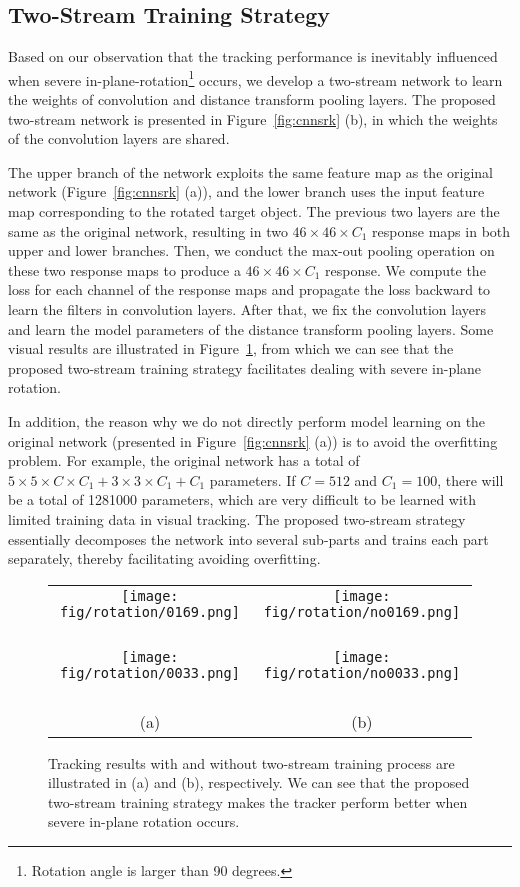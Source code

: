 \documentclass[10pt,twocolumn,letterpaper]{article}
\begin{document}
\subsection{Two-Stream Training Strategy}
Based on our observation that the tracking performance is inevitably influenced
when severe in-plane-rotation\footnote{Rotation angle is larger than 90 degrees.}
occurs, we develop a two-stream network to learn the weights of convolution and
distance transform pooling layers. The proposed two-stream network is presented
in Figure~\ref{fig:cnnsrk} (b), in which the weights of the convolution layers are shared.

The upper branch of the network exploits the same feature map as the original
network (Figure~\ref{fig:cnnsrk} (a)), and the lower branch uses the input
feature map corresponding to the rotated target object.
The previous two layers are the same as the original network, resulting in two
$46\times46\times C_1$ response maps in both upper and lower branches.
Then, we conduct the max-out pooling operation on these two response maps to
produce a $46\times46\times C_1$ response.
We compute the loss for each channel of the response maps and propagate the
loss backward to learn the filters in convolution layers.
After that, we fix the convolution layers and learn the model parameters of
the distance transform pooling layers.
Some visual results are illustrated in Figure~\ref{fig:rotation_result},
from which we can see that the proposed two-stream training strategy
facilitates dealing with severe in-plane rotation.

In addition, the reason why we do not directly perform model learning on
the original network (presented in Figure~\ref{fig:cnnsrk} (a)) is to avoid
the overfitting problem. For example, the original network has a total of
$5\times5\times C\times C_1+3\times3\times C_1+C_1$
parameters. If $C=512$ and $C_1=100$, there will be a total of
1281000 parameters, which are very difficult to be learned with limited training
data in visual tracking. The proposed two-stream strategy essentially
decomposes the network into several sub-parts and trains
each part separately, thereby facilitating avoiding overfitting.

\begin{figure}[t]
\centering
\begin{tabular}{c@{}c}
\texttt{[image: fig/rotation/0169.png]}
\ &
\texttt{[image: fig/rotation/no0169.png]}
\ \\
\texttt{[image: fig/rotation/0033.png]}
\ &
\texttt{[image: fig/rotation/no0033.png]}
\ \\
(a) & (b)
\end{tabular}
\caption{Tracking results with and without two-stream training
process are illustrated in (a) and (b), respectively. We can see
that the proposed two-stream training strategy makes the tracker
perform better when severe in-plane rotation occurs. }
\label{fig:rotation_result}
\end{figure}
\end{document}
